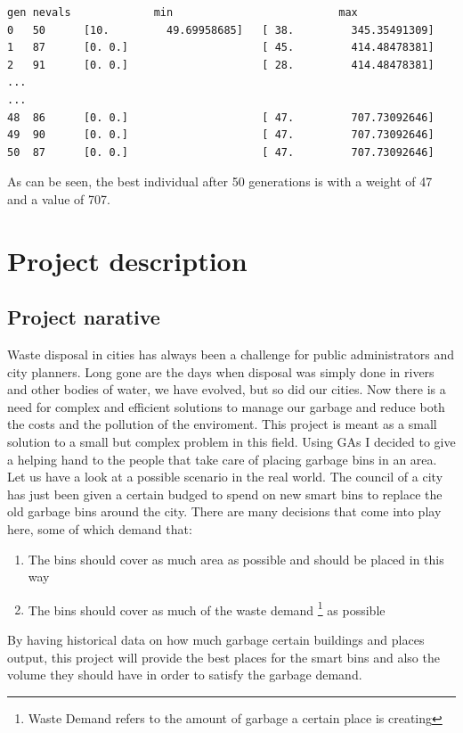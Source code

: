 \documentclass[a4paper,12pt]{report}
\begin{document}
\begin{lstlisting}
gen	nevals             min                      	max                        
0  	50    	[10.         49.69958685]	[ 38.         345.35491309]
1  	87    	[0. 0.]                  	[ 45.         414.48478381]
2  	91    	[0. 0.]                  	[ 28.         414.48478381]
...
...
48 	86    	[0. 0.]                  	[ 47.         707.73092646]
49 	90    	[0. 0.]                  	[ 47.         707.73092646]
50 	87    	[0. 0.]                  	[ 47.         707.73092646]
\end{lstlisting}

As can be seen, the best individual after 50 generations is with a weight of 47 and a value of 707.

\chapter{Project description}

\section {Project narative}
Waste disposal in cities has always been a challenge for public administrators and city planners\cite{purkayastha2015pollution}. Long gone are the days when disposal was simply done in rivers and other bodies of water, we have evolved, but so did our cities. Now there is a need for complex and efficient solutions to manage our garbage and reduce both the costs and the pollution of the enviroment.
This project is meant as a small solution to a small but complex problem in this field. Using GAs I decided to give a helping hand to the people that take care of placing garbage bins in an area.
Let us have a look at a possible scenario in the real world. The council of a city has just been given a certain budged to spend on new smart bins to replace the old garbage bins around the city. There are many decisions that come into play here, some of which demand that:
\begin{enumerate}
\item The bins should cover as much area as possible and should be placed in this way
\item The bins should cover as much of the waste demand \footnote{Waste Demand refers to the amount of garbage a certain place is creating} as possible
\end{enumerate}
By having historical data on how much garbage certain buildings and places output, this project will provide the best places for the smart bins and also the volume they should have in order to satisfy the garbage demand.
\end{document}
